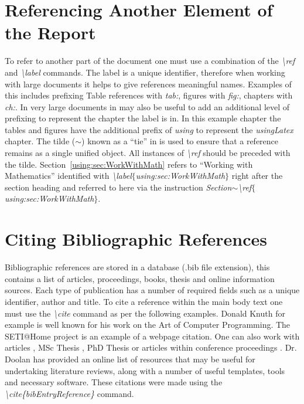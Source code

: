 \section{Referencing Another Element of the Report}

To refer to another part of the document one must use a combination of the \emph{\textbackslash ref} and \emph{\textbackslash label} commands. The label is a unique identifier, therefore when working with large documents it helps to give references meaningful names. Examples of this includes prefixing Table references with \emph{tab:}, figures with \emph{fig:}, chapters with \emph{ch:}. In very large documents in may also be useful to add an additional level of prefixing to represent the chapter the label is in. In this example chapter the tables and figures have the additional prefix of \emph{using} to represent the \emph{usingLatex} chapter. The tilde ($\sim$) known as a ``tie'' in \latex is used to ensure that a reference remains as a single unified object. All instances of \emph{\textbackslash ref} should be preceded with the tilde. Section~\ref{using:sec:WorkWithMath} refers to ``Working with Mathematics'' identified with \emph{\textbackslash label$\{$using:sec:WorkWithMath$\}$} right after the section heading and referred to here via the instruction \emph{Section$\sim$\textbackslash ref$\{$using:sec:WorkWithMath$\}$}.

\section{Citing Bibliographic References}
Bibliographic references are stored in a database (.bib file extension), this contains a list of articles, proceedings, books, thesis and online information sources. Each type of publication has a number of required fields such as a unique identifier, author and title. To cite a reference within the main body text one must use the \emph{\textbackslash cite} command as per the following examples. Donald Knuth \cite{book:knuth_1973} for example is well known for his work on the Art of Computer Programming. The SETI@Home project \cite{online:berkeleyBOINC} is an example of a webpage citation. One can also work with articles \cite{art:Russell:1978:Cray1}, MSc Thesis \cite{msc:Shannon:1940}, PhD Thesis \cite{phd:Sutherland:1963} or articles within conference proceedings \cite{proc:Ewald:1978:HPG}. Dr. Doolan \cite{online:Doolan:2016:AcademicResources} has provided an online list of resources that may be useful for undertaking literature reviews, along with a number of useful templates, \latex tools and necessary software. These citations were made using the \emph{\textbackslash cite\{bibEntryReference\}} command. 

